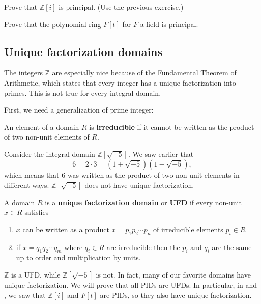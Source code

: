 \begin{exercise} \label{gaussianintegersareprincipal}
Prove that $\mathbb{Z}[i]$ is principal. (Use the previous exercise.)
\end{exercise} 

\begin{exercise} \label{polyringisprincipal}
Prove that the polynomial ring $F[t]$ for $F$ a field is principal. 
\end{exercise} 

\subsection{Unique factorization domains}

The integers $\mathbb{Z}$ are especially nice because of the Fundamental
Theorem of Arithmetic, which states that every integer has a unique
factorization into primes. This is not true for every integral domain.

First, we need a generalization of prime integer:
\begin{definition} 
An element of a domain $R$ is \textbf{irreducible} if it cannot be written
as the product of two non-unit elements of $R$.
\end{definition} 

\begin{example} 
Consider the integral domain $\mathbb{Z}[\sqrt{-5}]$. We saw earlier that 
\[ 
6 = 2 \cdot 3 = (1 + \sqrt{-5})(1 - \sqrt{-5}),
\] 
which means that $6$ was written as the product of two non-unit elements in
different ways. $\mathbb{Z}[\sqrt{-5}]$ does not have unique factorization.
\end{example} 

\begin{definition} 
A domain $R$ is a \textbf{unique factorization domain} or \textbf{UFD} if every
non-unit $x \in R$ satisfies
\begin{enumerate}
\item $x$ can be written as a product $x = p_1 p_2 \cdots p_n$ of 
irreducible elements $p_i \in R$
\item if $x = q_1 q_2 \cdots q_m$ where $q_i \in R$ are irreducible
then the $p_i$ and $q_i$ are the same up to order and multiplication by units.
\end{enumerate}
\end{definition} 

\begin{example}
$\mathbb{Z}$ is a UFD, while $\mathbb{Z}[\sqrt{-5}]$ is not. In fact, many of
our favorite domains have unique factorization. We will prove that all PIDs 
are UFDs. In particular, in   and
, we saw that $\mathbb{Z}[i]$ and $F[t]$ are PIDs,
so they also have unique factorization.
\end{example}

